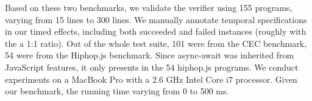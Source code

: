 \documentclass[acmsmall,review,anonymous]{acmart}\settopmatter{printfolios=true,printccs=false,printacmref=false}
\begin{document}



   

Based on these two benchmarks, we validate the verifier using 155  programs, varying from 15 lines to 300 lines. We manually annotate temporal specifications in our timed effects, including both succeeded and failed instances (roughly with the a 1:1 ratio). 
Out of the whole test suite, 101 were from the CEC benchmark, 54 were from the Hiphop.js benchmark.  Since async-await was inherited from JavaScript features, it only presents in the 54 hiphop.js programs.
We conduct experiments on a MacBook Pro with a 2.6 GHz Intel Core i7 processor. Given our benchmark, the running time varying from 0 to 500 ms. 

\end{document}
